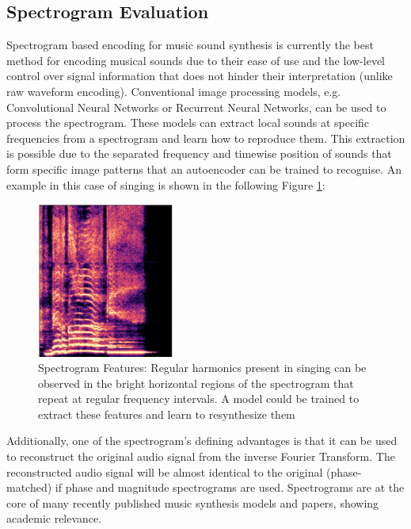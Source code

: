 \subsection{Spectrogram Evaluation}

Spectrogram based encoding for music sound synthesis is currently the best method for encoding musical sounds due to their ease of use and the low-level control over signal information that does not hinder their interpretation (unlike raw waveform encoding). Conventional image processing models, e.g. Convolutional Neural Networks or Recurrent Neural Networks, can be used to process the spectrogram. These models can extract local sounds at specific frequencies from a spectrogram and learn how to reproduce them. This extraction is possible due to the separated frequency and timewise position of sounds that form specific image patterns that an autoencoder can be trained to recognise. An example in this case of singing is shown in the following Figure \ref{fig:spectrogram_features}:

\begin{figure}[H]
    \centering
    \includegraphics[width=0.4\textwidth]{literature_review/SpectrogramFeatures.png}
    \caption{Spectrogram Features: Regular harmonics present in singing can be observed in the bright horizontal regions of the spectrogram that repeat at regular frequency intervals. A model could be trained to extract these features and learn to resynthesize them}
    \label{fig:spectrogram_features}
\end{figure}

Additionally, one of the spectrogram's defining advantages is that it can be used to reconstruct the original audio signal from the inverse Fourier Transform. The reconstructed audio signal will be almost identical to the original (phase-matched) if phase and magnitude spectrograms are used.
Spectrograms are at the core of many recently published music synthesis models and papers, showing academic relevance.

